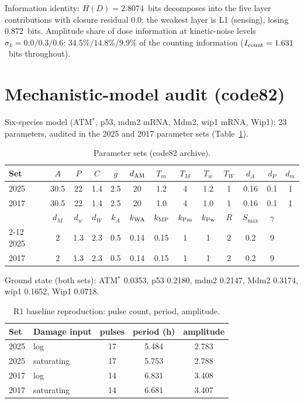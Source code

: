 \documentclass[11pt]{article}
\begin{document}
Information identity: $H(D)=2.8074$~bits decomposes into the five layer
contributions with closure residual $0.0$; the weakest layer is L1
(sensing), losing $0.872$~bits. Amplitude share of dose information at
kinetic-noise levels $\sigma_k = 0.0/0.3/0.6$: $34.5\% / 14.8\% / 9.9\%$
of the counting information ($I_{\rm count}=1.631$~bits throughout).

\section{Mechanistic-model audit (code82)}

Six-species model (ATM$^*$, p53, mdm2 mRNA, Mdm2, wip1 mRNA, Wip1);
23 parameters, audited in the 2025 and 2017 parameter sets
(Table~\ref{tab:params82}).

\begin{table}[h]
\centering\footnotesize
\caption{Parameter sets (code82 archive).}
\label{tab:params82}
\begin{tabular}{lcccccccccccc}
\toprule
Set & $A$ & $P$ & $C$ & $g$ & $d_{\rm AM}$ & $T_m$ & $T_M$ & $T_w$ & $T_W$ & $d_A$ & $d_P$ & $d_m$ \\
\midrule
2025 & 30.5 & 22 & 1.4 & 2.5 & 20 & 1.2 & 4 & 1.2 & 1 & 0.16 & 0.1 & 1 \\
2017 & 30.5 & 22 & 1.4 & 2.5 & 20 & 1.0 & 4 & 1.0 & 1 & 0.16 & 0.1 & 1 \\
\midrule
 & $d_M$ & $d_w$ & $d_W$ & $k_A$ & $k_{\rm WA}$ & $k_{\rm MP}$ & $k_{\rm Pm}$ & $k_{\rm Pw}$ & $R$ & $S_{\max}$ & $\gamma$ & \\
\cmidrule{2-12}
2025 & 2 & 1.3 & 2.3 & 0.5 & 0.14 & 0.15 & 1 & 1 & 2 & 0.2 & 9 & \\
2017 & 2 & 1.3 & 2.3 & 0.5 & 0.14 & 0.15 & 1 & 1 & 2 & 0.2 & 9 & \\
\bottomrule
\end{tabular}
\end{table}

Ground state (both sets): ATM$^*$ 0.0353, p53 0.2180, mdm2 0.2147,
Mdm2 0.3174, wip1 0.1652, Wip1 0.0718.

\begin{table}[h]
\centering\small
\caption{R1 baseline reproduction: pulse count, period, amplitude.}
\label{tab:r1}
\begin{tabular}{llccc}
\toprule
Set & Damage input & pulses & period (h) & amplitude \\
\midrule
2025 & log & 17 & 5.484 & 2.783 \\
2025 & saturating & 17 & 5.753 & 2.788 \\
2017 & log & 14 & 6.831 & 3.408 \\
2017 & saturating & 14 & 6.681 & 3.407 \\
\bottomrule
\end{tabular}
\end{table}
\end{document}
